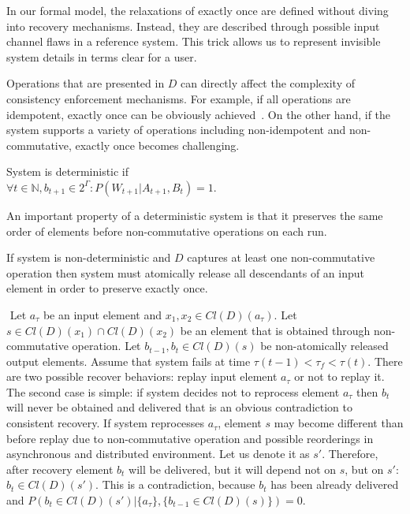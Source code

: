 In our formal model, the relaxations of exactly once are defined without diving into recovery mechanisms. Instead, they are described through possible input channel flaws in a reference system. This trick allows us to represent invisible system details in terms clear for a user.

Operations that are presented in $D$ can directly affect the complexity of consistency enforcement mechanisms. For example, if all operations are idempotent, exactly once can be obviously achieved~\cite{Akidau:2013:MFS:2536222.2536229}. On the other hand, if the system supports a variety of operations including non-idempotent and non-commutative, exactly once becomes challenging.

\begin{definition}{System is deterministic}
if\\ 
$\forall{t\in{\mathbb{N}}, b_{t+1}\in{2^{\Gamma}}}:P(W_{t+1}|A_{t+1},B_t)=1$.
\end{definition}

An important property of a deterministic system is that it preserves the same order of elements before non-commutative operations on each run.

\begin{theorem}
\label{necessary_conditions}
If system is non-deterministic and $D$ captures at least one non-commutative operation then system must atomically release all descendants of an input element in order to preserve exactly once.
\end{theorem}
\begin{sketch}
$ $\newline
Let $a_\tau$ be an input element and $x_1,x_2 \in Cl(D)(a_\tau)$. Let $s \in Cl(D)(x_1) \cap Cl(D)(x_2)$ be an element that is obtained through non-commutative operation. Let $b_{t-1},b_{t}\in{Cl(D)(s)}$ be non-atomically released output elements. Assume that system fails at time $\tau(t-1) < \tau_f < \tau(t)$. There are two possible recover behaviors: replay input element $a_\tau$ or not to replay it. The second case is simple: if system decides not to reprocess element $a_\tau$ then $b_t$ will never be obtained and delivered that is an obvious contradiction to consistent recovery. If system reprocesses $a_\tau$, element $s$ may become different than before replay due to non-commutative operation and possible reorderings in asynchronous and distributed environment. Let us denote it as $s'$. Therefore, after recovery element $b_t$ will be delivered, but it will depend not on $s$, but on $s'$: $b_t\in Cl(D)(s')$. This is a contradiction, because $b_t$ has been already delivered and $P(b_{t}\in Cl(D)(s')|\{a_\tau\},\{b_{t-1} \in Cl(D)(s) \})=0$.
\end{sketch}

